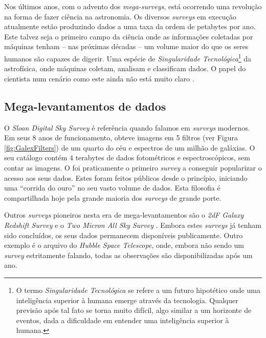 Nos últimos anos, com o advento dos {\em mega-surveys}, está ocorrendo uma
revolução na forma de fazer ciência na astronomia. Os diversos {\em surveys} em
execução atualmente estão produzindo dados a uma taxa da ordem de petabytes por
ano. Este talvez seja o primeiro campo da ciência onde as informações coletadas
por máquinas tenham -- nas próximas décadas -- um volume maior do que os seres
humanos são capazes de digerir. Uma espécie de {\em Singularidade
Tecnológica}\footnote{O termo {\em Singularidade Tecnológica} se refere a um
futuro hipotético onde uma inteligência superior à humana emerge através da
tecnologia. Qualquer previsão após tal fato se torna muito difícil, algo similar
a um horizonte de eventos, dada a dificuldade em entender uma inteligência
superior à humana.} da astrofísica, onde máquinas coletam, analisam e
classificam dados. O papel do cientista num cenário como este ainda não está
muito claro \citep{Norris2010}.

\subsection{Mega-levantamentos de dados}

O {\em Sloan Digital Sky Survey} \citep[\SDSS; ][]{York2000} é referência quando
falamos em {\em surveys} modernos. Em seus 8 anos de funcionamento, obteve
imagens em 5 filtros (ver Figura \ref{fig:GalexFilters}) de um quarto do céu e
espectros de um milhão de galáxias. O seu catálogo contém 4 terabytes de dados
fotométricos e espectroscópicos, sem contar as imagens. O \SDSS foi praticamente
o primeiro {\em survey} a conseguir popularizar o acesso aos seus dados. Estes
foram feitos públicos desde o princípio, iniciando uma ``corrida do ouro'' no
seu vasto volume de dados. Esta filosofia é compartilhada hoje pela grande
maioria dos {\em surveys} de grande porte.

Outros {\em surveys} pioneiros nesta era de mega-levantamentos são o
{\em 2dF Galaxy Redshift Survey} \citep[2dFGRS;][]{Colless1999} e o {\em Two
Micron All Sky Survey} \citep[2MASS;][]{Skrutskie2006}. Embora estes {\em
surveys} já tenham sido concluídos, os seus dados permanecem disponíveis
publicamente. Outro exemplo é o arquivo do {\em Hubble Space Telescope}, onde,
embora não sendo um {\em survey} estritamente falando, todas as observações são
disponibilizadas após um ano.

